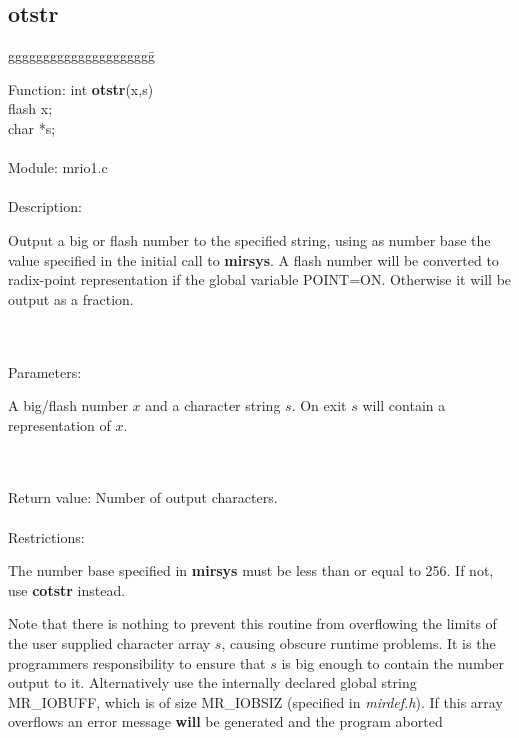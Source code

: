 \subsection{otstr}
\begin{tabbing}
ggggggggggggggggggggg\= \kill



      Function:      \>int {\bf otstr}(x,s) \\
                     \>flash x; \\
                     \>char *s; \\
      \ \\
      Module:        \>mrio1.c \\
      \ \\
      Description:   \>
                     \parbox[t]{3in}
                     {Output a big or flash number to the specified string, 
                      using as number base the value specified in the
                      initial call to {\bf mirsys}.
                     A flash number will be converted to radix-point
                     representation if the global variable POINT=ON. Otherwise
                     it will be output as a fraction.} \\
      \ \\
      Parameters:    \>
                     \parbox[t]{3 in}
                     {A big/flash number $x$ and a character string $s$. On 
                      exit $s$ will contain a representation of $x$.} \\
      \ \\
      Return value:  \>Number of output characters. \\
      \ \\
      Restrictions:  \>
                     \parbox[t]{3 in}
                     {The number base specified in {\bf mirsys} must be less 
                     than or equal to 256. If not, use {\bf cotstr} 
                     instead.
 
                     Note that there is nothing to prevent this routine from
                      overflowing the limits of the user supplied character 
                      array $s$, causing obscure runtime problems. It is the 
                      programmers responsibility to
                      ensure that $s$ is big enough to contain the number 
                      output to it. Alternatively use the internally declared 
                      global string MR\_IOBUFF, which is of size MR\_IOBSIZ 
                      (specified in {\em mirdef.h}). If this array overflows 
                      an error message {\bf will} be generated and the program 
                      aborted} \\
 
\end{tabbing}             
\pagebreak
